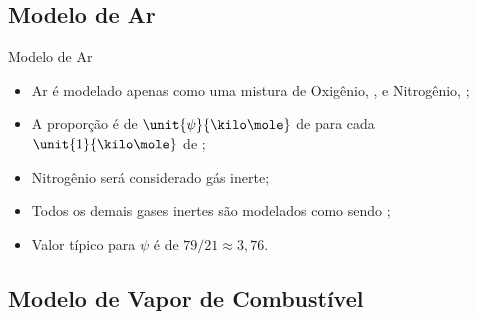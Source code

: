 \subsection{Modelo de Ar}

    \begin{frame}{Modelo de Ar}\vspace*{-2em}
        \begin{itemize}
            \item<1-> Ar é modelado \alert{apenas} como uma mistura de Oxigênio,
                \alert{}, e Nitrogênio, \alert{}; \\[\bigskipamount]
            \item<2-> A proporção é de \alert{$\unit{\psi}{\kilo\mole}$ de } para cada
                \alert{$\unit{1}{\kilo\mole}$ de }; \\[\bigskipamount]
            \item<3-> Nitrogênio será considerado \alert{gás inerte}; \\[\bigskipamount]
            \item<4-> Todos os demais gases inertes são modelados como sendo \alert{};
                \\[\bigskipamount]
            \item<5-> Valor típico para \alert{$\psi$} é de \alert{$79/21 \approx 3,76$}.
        \end{itemize}
    \end{frame}

\subsection{Modelo de Vapor de Combustível}


